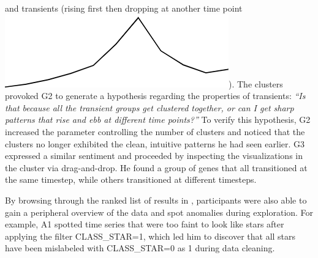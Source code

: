  and transients (rising first then dropping at another time point \includegraphics[width=2\baselineskip,keepaspectratio]{figures/transient.png}). The clusters provoked G2 to generate a hypothesis
 regarding the properties of transients:
 \textit{``Is that because all the transient groups
 get clustered together, or can I get sharp patterns
 that rise and ebb at different time points?''}
 To verify this hypothesis, G2 increased the parameter controlling the number of clusters and noticed that the clusters
 no longer exhibited the clean,
 intuitive patterns he had seen earlier.
 G3 expressed a similar sentiment and proceeded
 by inspecting the visualizations
 in the cluster via drag-and-drop.
 He found a group of genes that all transitioned
 at the same timestep, while others transitioned
 at different timesteps.
 \par By browsing through the ranked list of
 results in \zvpp, participants were also able to
 gain a peripheral overview of the data
 and spot anomalies during exploration.
 For example, A1 spotted time series
 that were too faint to look like stars
 after applying the filter CLASS\_STAR=1,
 which led him to discover that all stars
 have been mislabeled with CLASS\_STAR=0 as 1 during data cleaning.
